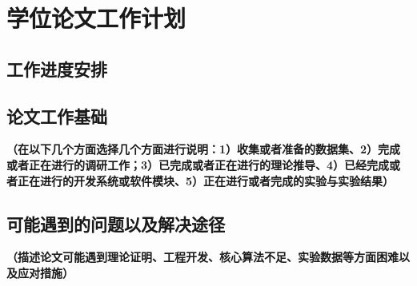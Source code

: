\section{学位论文工作计划}

\subsection{工作进度安排}

\subsection{论文工作基础}

\textbf{\color{red}（在以下几个方面选择几个方面进行说明：1）收集或者准备的数据集、2）完成或者正在进行的调研工作；3）已完成或者正在进行的理论推导、4）已经完成或者正在进行的开发系统或软件模块、5）正在进行或者完成的实验与实验结果）}

\subsection{可能遇到的问题以及解决途径}
\textbf{\color{red}
（描述论文可能遇到理论证明、工程开发、核心算法不足、实验数据等方面困难以及应对措施）}

\clearpage
